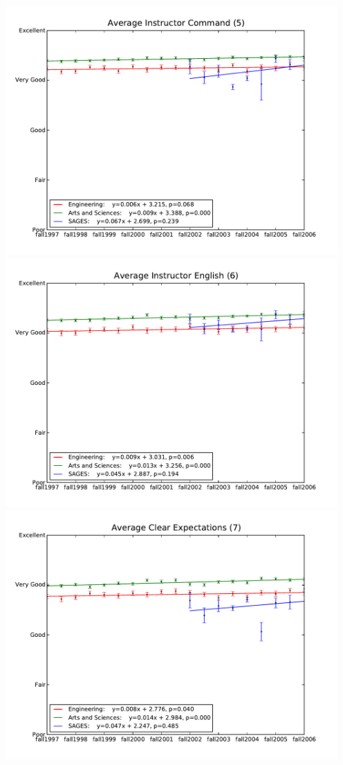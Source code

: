 \documentclass[12pt]{article}
\begin{document}
\begin{center}
    \includegraphics[width=5in]{figures/5_command_over_time.pdf} \\
    \includegraphics[width=5in]{figures/6_english_over_time.pdf} \\
    \includegraphics[width=5in]{figures/7_expectations_over_time.pdf} \\

\end{center}
\end{document}
